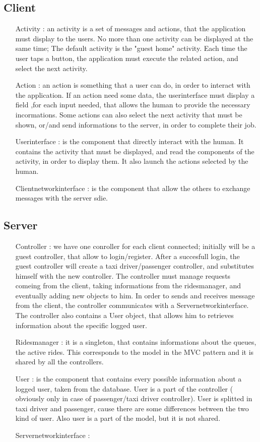 	\subsection{Client}
	 \begin{itemize}
	  \item [Activity]: an activity is a set of messages and actions, that the application must display to the users.
	  No more than one activity can be displayed at the same time;
	  The default activity is the "guest home" activity. Each time the user taps a button, the application must execute
	  the related action, and select the next activity. 
	  \item [Action]: an action is something that a user can do, in order to interact with the application.
	  If an action need some data, the userinterface must display a field ,for each input needed, that allows the human
	  to provide the necessary incormations.
	  Some actions can also select the next activity that must be shown, or/and send informations to the server,
	  in order to complete their job.
	  \item [Userinterface]: is the component that directly interact with the human.
	  It contains the activity that must be displayed, and read the components of the activity, in order to display them.
	  It also launch the actions selected by the human.
	  \item[Clientnetworkinterface]: is the component that allow the others to exchange messages with the server sdie.
	 \end{itemize}
	\subsection{Server}
	\begin{itemize}
	 \item [Controller]: we have one conroller for each client connected; initially will be a guest controller,
	 that allow to login/register. After a succesfull login, the guest controller will create a taxi driver/passenger controller,
	 and substitutes himself with the new controller. The controller must manage requests comeing from
	 the client, taking informations from the ridesmanager, and eventually adding new objects to him.
	 In order to sends and receives message from the client, the controller communicates with a Servernetworkinterface.
	 The controller also contains a User object, that allows him to retrieves information about the specific logged user.
	 \item [Ridesmanager]: it is a singleton, that contains informations about the queues, the active rides. This corresponds 
	 to the model in the MVC pattern and it is shared by all the controllers.
	 \item [User]: is the component that contains every possible information about a logged user, taken from the database.
	 User is a part of the controller ( obviously only in case of passenger/taxi driver controller).
	 User is splitted in taxi driver and passenger, cause there are some differences between the two kind of user.
	 Also user is a part of the model, but it is not shared.
	 \item[Servernetworkinterface]:
	\end{itemize}
